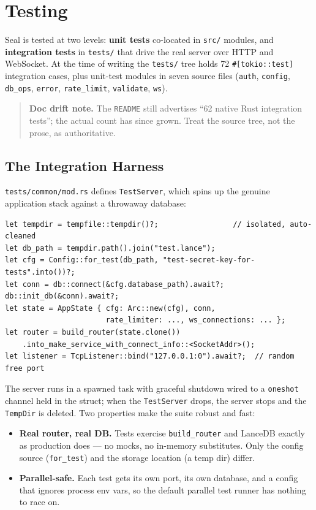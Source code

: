 \chapter{Testing}
\label{chap:testing}

Seal is tested at two levels: \textbf{unit tests} co-located in \verb|src/|
modules, and \textbf{integration tests} in \verb|tests/| that drive the real
server over HTTP and WebSocket. At the time of writing the \verb|tests/| tree
holds 72 \verb|#[tokio::test]| integration cases, plus unit-test modules in seven
source files (\verb|auth|, \verb|config|, \verb|db_ops|, \verb|error|,
\verb|rate_limit|, \verb|validate|, \verb|ws|).

\begin{quote}
\textbf{Doc drift note.} The \verb|README| still advertises ``62 native Rust
integration tests''; the actual count has since grown. Treat the source tree, not
the prose, as authoritative.
\end{quote}

\section{The Integration Harness}

\verb|tests/common/mod.rs| defines \verb|TestServer|, which spins up the genuine
application stack against a throwaway database:

\begin{lstlisting}
let tempdir = tempfile::tempdir()?;                 // isolated, auto-cleaned
let db_path = tempdir.path().join("test.lance");
let cfg = Config::for_test(db_path, "test-secret-key-for-tests".into())?;
let conn = db::connect(&cfg.database_path).await?;
db::init_db(&conn).await?;
let state = AppState { cfg: Arc::new(cfg), conn,
                       rate_limiter: ..., ws_connections: ... };
let router = build_router(state.clone())
    .into_make_service_with_connect_info::<SocketAddr>();
let listener = TcpListener::bind("127.0.0.1:0").await?;  // random free port
\end{lstlisting}

The server runs in a spawned task with graceful shutdown wired to a
\verb|oneshot| channel held in the struct; when the \verb|TestServer| drops, the
server stops and the \verb|TempDir| is deleted. Two properties make the suite
robust and fast:

\begin{itemize}
  \item \textbf{Real router, real DB.} Tests exercise \verb|build_router| and
        LanceDB exactly as production does --- no mocks, no in-memory
        substitutes. Only the config source (\verb|for_test|) and the storage
        location (a temp dir) differ.
  \item \textbf{Parallel-safe.} Each test gets its own port, its own database,
        and a config that ignores process env vars, so the default parallel test
        runner has nothing to race on.
\end{itemize}

